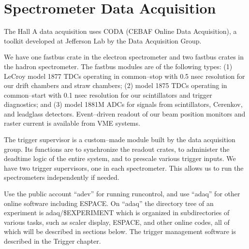  
\section{Spectrometer Data Acquisition}






\par
The Hall A data acquisition uses CODA\cite{CODAwww}
(CEBAF Online Data Acquisition), a toolkit
developed at Jefferson Lab by the Data
Acquisition Group.  

\par
We have one fastbus crate in the
electron spectrometer and two fastbus
crates in the hadron spectrometer.
The fastbus modules are of the following
types:
(1) LeCroy model
1877 TDCs operating in common--stop with 0.5 nsec
resolution for our drift chambers and
straw chambers; (2) model 1875 TDCs
operating in common--start with 0.1 nsec resolution
for our scintillators and trigger 
diagnostics; and (3) model 1881M ADCs
for signals from scintillators, 
Cerenkov, and leadglass detectors.
Event--driven readout of our beam position
monitors and raster current is
available from VME systems.

\par
The trigger supervisor is a custom--made
module built by the data
acquisition group.  Its functions are to
synchronize the readout crates, to administer
the deadtime logic of the entire system, and
to prescale various trigger inputs.  
We have two trigger supervisors,
one in each spectrometer.  This allows us to
run the spectrometers independently if needed.

\par
Use the public account ``adev''
for running runcontrol, and use ``adaq''
for other online software including ESPACE.
On ``adaq'' the directory
tree of an experiment is adaq/\$EXPERIMENT
which is organized in subdirectories of 
various tasks, such as scaler display,
ESPACE, and other online codes, all of
which will be described in sections below.
The trigger management software is described in
the Trigger chapter. 

